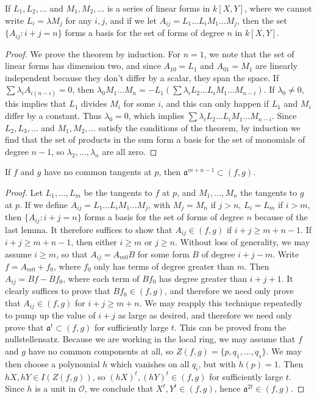 \begin{lemma}
    If $L_1, L_2, \dots$ and $M_1, M_2, \dots$ is a series of linear forms in $k[X,Y]$, where we cannot write $L_i = \lambda M_j$ for any $i,j$, and if we let $A_{ij} = L_1 \dots L_i M_1 \dots M_j$, then the set $\{ A_{ij} : i + j = n \}$ forms a basis for the set of forms of degree $n$ in $k[X,Y]$.
\end{lemma}
\begin{proof}
    We prove the theorem by induction. For $n = 1$, we note that the set of linear forms has dimension two, and since $A_{10} = L_1$ and $A_{01} = M_1$ are linearly independent because they don't differ by a scalar, they span the space. If $\sum \lambda_i A_{i(n-i)} = 0$, then $\lambda_0 M_1 \dots M_n = -L_1(\sum \lambda_i L_2 \dots L_i M_1 \dots M_{n-i})$. If $\lambda_0 \neq 0$, this implies that $L_1$ divides $M_i$ for some $i$, and this can only happen if $L_1$ and $M_i$ differ by a constant. Thus $\lambda_0 = 0$, which implies $\sum \lambda_i L_2 \dots L_i M_1 \dots M_{n-i}$. Since $L_2, L_3, \dots$ and $M_1, M_2, \dots$ satisfy the conditions of the theorem, by induction we find that the set of products in the sum form a basis for the set of monomials of degree $n-1$, so $\lambda_2, \dots, \lambda_n$ are all zero.
\end{proof}

\begin{lemma}
    If $f$ and $g$ have no common tangents at $p$, then $\mathfrak{a}^{m+n-1} \subset (f,g)$.
\end{lemma}
\begin{proof}
    Let $L_1, \dots, L_m$ be the tangents to $f$ at $p$, and $M_1, \dots, M_n$ the tangents to $g$ at $p$. If we define $A_{ij} = L_1 \dots L_i M_1 \dots M_j$, with $M_j = M_n$ if $j > n$, $L_i = L_m$ if $i > m$, then $\{ A_{ij}: i + j = n \}$ forms a basis for the set of forms of degree $n$ because of the last lemma. It therefore suffices to show that $A_{ij} \in (f,g)$ if $i + j \geq m + n - 1$. If $i + j \geq m + n - 1$, then either $i \geq m$ or $j \geq n$. Without loss of generality, we may assume $i \geq m$, so that $A_{ij} = A_{m0}B$ for some form $B$ of degree $i + j - m$. Write $f = A_{m0} + f_0$, where $f_0$ only has terms of degree greater than $m$. Then $A_{ij} = Bf - Bf_0$, where each term of $Bf_0$ has degree greater than $i + j + 1$. It clearly suffices to prove that $Bf_0 \in (f,g)$, and therefore we need only prove that $A_{ij} \in (f,g)$ for $i + j \geq m + n$. We may reapply this technique repeatedly to pump up the value of $i + j$ as large as desired, and therefore we need only prove that $\mathfrak{a}^t \subset (f,g)$ for sufficiently large $t$. This can be proved from the nullstellensatz. Because we are working in the local ring, we may assume that $f$ and $g$ have no common components at all, so $Z(f,g) = \{ p, q_1, \dots, q_s \}$. We may then choose a polynomial $h$ which vanishes on all $q_i$, but with $h(p) = 1$. Then $hX, hY \in I(Z(f,g))$, so $(hX)^t, (hY)^t \in (f,g)$ for sufficiently large $t$. Since $h$ is a unit in $\mathcal{O}$, we conclude that $X^t, Y^t \in (f,g)$, hence $\mathfrak{a}^{2t} \in (f,g)$.
\end{proof}

